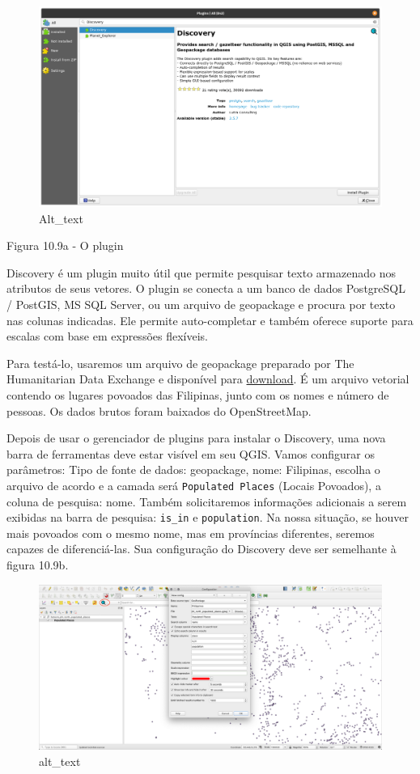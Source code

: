 \documentclass[
]{book}
\begin{document}
\begin{figure}
\centering
\includegraphics{media/modulo10/fig109_a.png}
\caption{Alt\_text}
\end{figure}

Figura 10.9a - O plugin

Discovery é um plugin muito útil que permite pesquisar texto armazenado nos atributos de seus vetores. O plugin se conecta a um banco de dados PostgreSQL / PostGIS, MS SQL Server, ou um arquivo de geopackage e procura por texto nas colunas indicadas. Ele permite auto-completar e também oferece suporte para escalas com base em expressões flexíveis.

Para testá-lo, usaremos um arquivo de geopackage preparado por The Humanitarian Data Exchange e disponível para \href{https://data.humdata.org/dataset/hotosm_phl_north_populated_places}{download}. É um arquivo vetorial contendo os lugares povoados das Filipinas, junto com os nomes e número de pessoas. Os dados brutos foram baixados do OpenStreetMap.

Depois de usar o gerenciador de plugins para instalar o Discovery, uma nova barra de ferramentas deve estar visível em seu QGIS. Vamos configurar os parâmetros: Tipo de fonte de dados: geopackage, nome: Filipinas, escolha o arquivo de acordo e a camada será \texttt{Populated\ Places} (Locais Povoados), a coluna de pesquisa: nome. Também solicitaremos informações adicionais a serem exibidas na barra de pesquisa: \texttt{is\_in} e \texttt{population}. Na nossa situação, se houver mais povoados com o mesmo nome, mas em províncias diferentes, seremos capazes de diferenciá-las. Sua configuração do Discovery deve ser semelhante à figura 10.9b.

\begin{figure}
\centering
\includegraphics{media/modulo10/fig109_b.png}
\caption{alt\_text}
\end{figure}
\end{document}
